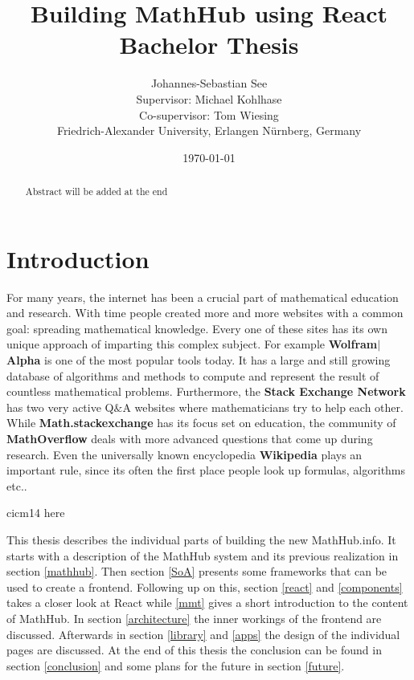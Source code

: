 \documentclass[11pt,a4paper]{article}
\title{Building MathHub using React\\ \vspace{2 mm} Bachelor Thesis}
\author{Johannes-Sebastian See\\Supervisor: Michael Kohlhase\\Co-supervisor: Tom Wiesing\\Friedrich-Alexander University, Erlangen Nürnberg, Germany}
\date{\today}
\begin{document}
\begin{titlepage}
\maketitle
\begin{abstract}
Abstract will be added at the end
\end{abstract}

\end{titlepage}

\tableofcontents
\pagebreak
\section{Introduction}
For many years, the internet has been a crucial part of mathematical education and research.
With time people created more and more websites with a common goal: spreading mathematical knowledge.
Every one of these sites has its own unique approach of imparting this complex subject.
For example \textbf{Wolfram$|$Alpha} \cite{wolfram} is one of the most popular tools today.
It has a large and still growing database of algorithms and methods to compute and represent the result of countless mathematical problems.
Furthermore, the \textbf{Stack Exchange Network} has two very active Q$\&$A websites where mathematicians try to help each other.
While \textbf{Math.stackexchange} has its focus set on education, the community of \textbf{MathOverflow} deals with more advanced questions that come up during research.
Even the universally known encyclopedia \textbf{Wikipedia} plays an important rule, since its often the first place people look up formulas, algorithms etc.. 

cicm14 here 

\vspace{2cm} \noindent
This thesis describes the individual parts of building the new MathHub.info.
It starts with a description of the MathHub system and its previous realization in section \ref{mathhub}.
Then section \ref{SoA} presents some frameworks that can be used to create a frontend.
Following up on this, section \ref{react} and \ref{components} takes a closer look at React while \ref{mmt} gives a short introduction to the content of MathHub.
In section \ref{architecture} the inner workings of the frontend are discussed.
Afterwards in section \ref{library} and \ref{apps} the design of the individual pages are discussed.
At the end of this thesis the conclusion can be found in section \ref{conclusion} and some plans for the future in section \ref{future}.
\end{document}

